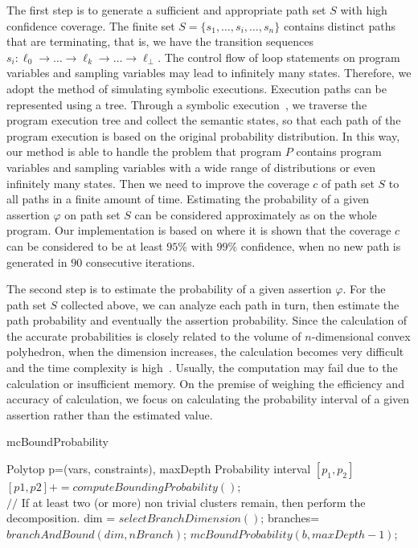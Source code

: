 \documentclass[sigconf,review, anonymous]{acmart}
\begin{document}
The first step is to generate a sufficient and appropriate path set $S$ with high confidence coverage. The finite set $S=\{s_1,\dots,s_i,\dots,s_n\}$ contains distinct paths that are terminating, that is, we have the transition sequences $s_i: \ell_0 \to \dots \to \ell_k \to \dots \to \ell_{\bot}$. The control flow of loop statements on program variables and sampling variables may lead to infinitely many states. Therefore, we adopt the method of simulating symbolic executions. Execution paths can be represented using a tree. Through a symbolic execution~\cite{Geldenhuys2012symbolic}, we traverse the program execution tree and collect the semantic states, so that each path of the program execution is based on the original probability distribution. In this way, our method is able to handle the problem that program $P$ contains program variables and sampling variables with a wide range of distributions or even infinitely many states. Then we need to improve the coverage $c$ of path set $S$ to all paths in a finite amount of time. Estimating the probability of a given assertion $\varphi$ on path set $S$ can be considered approximately as on the whole program. Our implementation is based on \cite{Sankaranarayanan2013Static} where it is shown that the coverage $c$ can be considered to be at least $95\%$ with $99\%$ confidence, when no new path is generated in $90$ consecutive iterations.


The second step is to estimate the probability of a given assertion $\varphi$. For the path set $S$ collected above, we can analyze each path in turn, then estimate the path probability and eventually the assertion probability. Since the calculation of the accurate probabilities is closely related to the volume of $n$-dimensional convex polyhedron, when the dimension increases, the calculation becomes very difficult and the time complexity is high~\cite{Arora1998Proof}. Usually, the computation may fail due to the calculation or insufficient memory. On the premise of weighing the efficiency and accuracy of calculation, we focus on calculating the probability interval of a given assertion rather than the estimated value.

\begin{algorithm}
	\caption{mcBoundProbability}
	\label{mcBoundProbability}
	\begin{algorithmic}[1]
		\REQUIRE Polytop p=(vars, constraints), maxDepth
		\ENSURE Probability interval $[p_1, p_2]$
			\STATE $[p1,p2]+=computeBoundingProbability()$;
		\ENDIF  \\
		$//$ If at least two (or more) non trivial clusters remain, then perform the
		decomposition.  
			\STATE dim = $selectBranchDimension()$;
			\STATE branches= $branchAndBound(dim, nBranch)$;
			\STATE $mcBoundProbability(b, maxDepth-1)$;
			\ENDFOR
		\ENDIF
	\end{algorithmic}
\end{algorithm}
\end{document}
